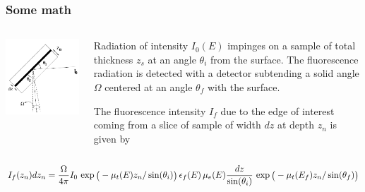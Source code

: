 \documentclass[10pt, xcolor=x11names, compress]{beamer}
\begin{document}
\begin{frame}
  \frametitle{Some math}

  \small
  \begin{columns}
    \begin{column}{0.35\linewidth}
      \includegraphics[width=\linewidth]{images/schematic.png}
    \end{column}
    \begin{column}{0.65\linewidth}
      Radiation of intensity $I_0(E)$ impinges on a sample of total
      thickness $z_s$ at an angle $\theta_i$ from the surface. The
      fluorescence radiation is detected with a detector subtending a solid
      angle $\Omega$ centered at an angle $\theta_f$ with the surface.

      \smallskip
      
      The fluorescence intensity $I_f$ due to the edge of interest coming
      from a slice of sample of width $dz$ at depth $z_n$ is given by
    \end{column}
  \end{columns}

  \begin{equation}
    \scriptsize
    \label{eq:dz}
    I_f(z_n)dz_n = \frac{\Omega}{4\pi} I_0\,\exp\big(-\mu_t(E)z_n/\sin(\theta_i)\big)
    \,\epsilon_f(E)\,\mu_e(E) \frac{dz}{\sin(\theta_i)}\,
    \exp\big(-\mu_t(E_f)z_n/\sin(\theta_f)\big)
  \end{equation}


\end{frame}
\end{document}
